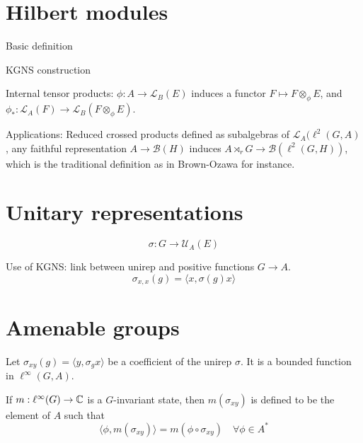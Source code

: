 \section{Hilbert modules}

Basic definition

KGNS construction

Internal tensor products: $\phi : A \rightarrow \mathcal L_B(E)$ induces a functor $F\mapsto F\otimes_\phi E$, and $\phi_* : \mathcal L_A(F) \rightarrow \mathcal L_B(F\otimes_\phi E)$.

Applications:
Reduced crossed products defined as subalgebras of $\mathcal L_A(\ell^2(G,A)$, any faithful representation $A\rightarrow \mathcal B(H)$ induces $A\rtimes_r G \rightarrow \mathcal B(\ell^2(G,H))$, which is the traditional definition as in Brown-Ozawa for instance.

\section{Unitary representations}

\[\sigma : G\rightarrow \mathcal U_A(E)\]

Use of KGNS: link between unirep and positive functions $G\rightarrow A$.
\[\sigma_{x,x}(g)= \langle x, \sigma(g)x \rangle\]

\section{Amenable groups}

Let $\sigma_{xy}(g)=\langle y, \sigma_g x\rangle$ be a coefficient of the unirep $\sigma$. It is a bounded function in $\ell^\infty(G,A)$.

If $m: \ell^\infty (G)\rightarrow \mathbb C$ is a $G$-invariant state, then $m(\sigma_{xy})$ is defined to be the element of $A$ such that
\[ \langle \phi, m(\sigma_{xy} ) \rangle = m(\phi\circ \sigma_{xy}) \quad \forall \phi\in A^*\]